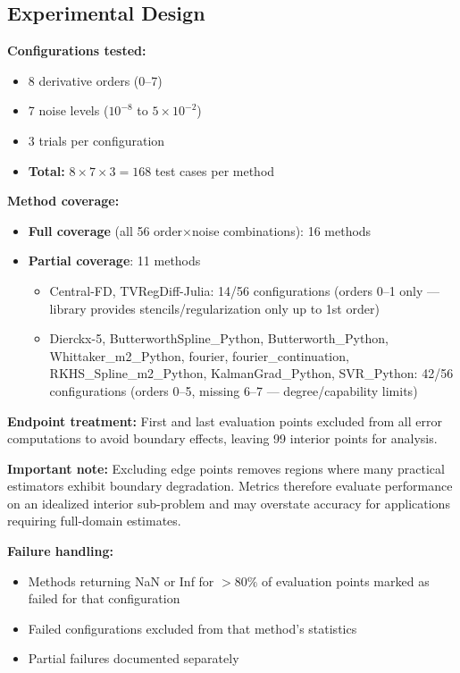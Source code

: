 \subsection{Experimental Design}
\label{sec:experimental_design}

\textbf{Configurations tested:}
\begin{itemize}
    \item 8 derivative orders (0--7)
    \item 7 noise levels ($10^{-8}$ to $5 \times 10^{-2}$)
    \item 3 trials per configuration
    \item \textbf{Total:} $8 \times 7 \times 3 = 168$ test cases per method
\end{itemize}

\textbf{Method coverage:}
\begin{itemize}
    \item \textbf{Full coverage} (all 56 order$\times$noise combinations): 16 methods
    \item \textbf{Partial coverage}: 11 methods
    \begin{itemize}
        \item Central-FD, TVRegDiff-Julia: 14/56 configurations (orders 0--1 only --- library provides stencils/regularization only up to 1st order)
        \item Dierckx-5, ButterworthSpline\_Python, Butterworth\_Python, Whittaker\_m2\_Python, fourier, fourier\_continuation, RKHS\_Spline\_m2\_Python, KalmanGrad\_Python, SVR\_Python: 42/56 configurations (orders 0--5, missing 6--7 --- degree/capability limits)
    \end{itemize}
\end{itemize}

\textbf{Endpoint treatment:} First and last evaluation points excluded from all error computations to avoid boundary effects, leaving 99 interior points for analysis.

\textbf{Important note:} Excluding edge points removes regions where many practical estimators exhibit boundary degradation. Metrics therefore evaluate performance on an idealized interior sub-problem and may overstate accuracy for applications requiring full-domain estimates.

\textbf{Failure handling:}
\begin{itemize}
    \item Methods returning NaN or Inf for $>80\%$ of evaluation points marked as failed for that configuration
    \item Failed configurations excluded from that method's statistics
    \item Partial failures documented separately
\end{itemize}

